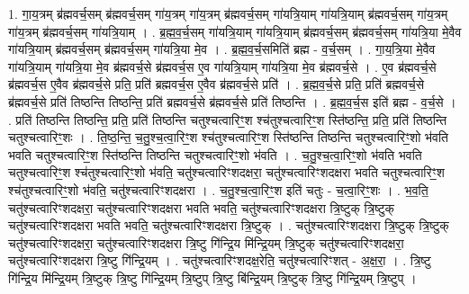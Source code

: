 \documentclass[17pt]{extarticle}
\begin{document}
1. गा॒य॒त्रम् ब्र॑ह्मवर्च॒सम् ब्र॑ह्मवर्च॒सम् गा॑य॒त्रम् गा॑य॒त्रम् ब्र॑ह्मवर्च॒सम् गा॑यत्रि॒याम् गा॑यत्रि॒याम् ब्र॑ह्मवर्च॒सम् गा॑य॒त्रम् गा॑य॒त्रम् ब्र॑ह्मवर्च॒सम् गा॑यत्रि॒याम् । . ब्र॒ह्म॒व॒र्च॒सम् गा॑यत्रि॒याम् गा॑यत्रि॒याम् ब्र॑ह्मवर्च॒सम् ब्र॑ह्मवर्च॒सम् गा॑यत्रि॒या मे॒वैव गा॑यत्रि॒याम् ब्र॑ह्मवर्च॒सम् ब्र॑ह्मवर्च॒सम् गा॑यत्रि॒या मे॒व । . ब्र॒ह्म॒व॒र्च॒समिति॑ ब्रह्म - व॒र्च॒सम् । . गा॒य॒त्रि॒या मे॒वैव गा॑यत्रि॒याम् गा॑यत्रि॒या मे॒व ब्र॑ह्मवर्च॒से ब्र॑ह्मवर्च॒स ए॒व गा॑यत्रि॒याम् गा॑यत्रि॒या मे॒व ब्र॑ह्मवर्च॒से । . ए॒व ब्र॑ह्मवर्च॒से ब्र॑ह्मवर्च॒स ए॒वैव ब्र॑ह्मवर्च॒से प्रति॒ प्रति॑ ब्रह्मवर्च॒स ए॒वैव ब्र॑ह्मवर्च॒से प्रति॑ । . ब्र॒ह्म॒व॒र्च॒से प्रति॒ प्रति॑ ब्रह्मवर्च॒से ब्र॑ह्मवर्च॒से प्रति॑ तिष्ठन्ति तिष्ठन्ति॒ प्रति॑ ब्रह्मवर्च॒से ब्र॑ह्मवर्च॒से प्रति॑ तिष्ठन्ति । . ब्र॒ह्म॒व॒र्च॒स इति॑ ब्रह्म - व॒र्च॒से । . प्रति॑ तिष्ठन्ति तिष्ठन्ति॒ प्रति॒ प्रति॑ तिष्ठन्ति चतुश्चत्वारिꣳ॒॒श श्च॑तुश्चत्वारिꣳ॒॒श स्ति॑ष्ठन्ति॒ प्रति॒ प्रति॑ तिष्ठन्ति चतुश्चत्वारिꣳ॒॒शः । . ति॒ष्ठ॒न्ति॒ च॒तु॒श्च॒त्वा॒रिꣳ॒॒श श्च॑तुश्चत्वारिꣳ॒॒श स्ति॑ष्ठन्ति तिष्ठन्ति चतुश्चत्वारिꣳ॒॒शो भ॑वति भवति चतुश्चत्वारिꣳ॒॒श स्ति॑ष्ठन्ति तिष्ठन्ति चतुश्चत्वारिꣳ॒॒शो भ॑वति । . च॒तु॒श्च॒त्वा॒रिꣳ॒॒शो भ॑वति भवति चतुश्चत्वारिꣳ॒॒श श्च॑तुश्चत्वारिꣳ॒॒शो भ॑वति॒ चतु॑श्चत्वारिꣳशदक्षरा॒ चतु॑श्चत्वारिꣳशदक्षरा भवति चतुश्चत्वारिꣳ॒॒श श्च॑तुश्चत्वारिꣳ॒॒शो भ॑वति॒ चतु॑श्चत्वारिꣳशदक्षरा । . च॒तु॒श्च॒त्वा॒रिꣳ॒॒श इति॑ चतुः - च॒त्वा॒रिꣳ॒॒शः । . भ॒व॒ति॒ चतु॑श्चत्वारिꣳशदक्षरा॒ चतु॑श्चत्वारिꣳशदक्षरा भवति भवति॒ चतु॑श्चत्वारिꣳशदक्षरा त्रि॒ष्टुक् त्रि॒ष्टुक् चतु॑श्चत्वारिꣳशदक्षरा भवति भवति॒ चतु॑श्चत्वारिꣳशदक्षरा त्रि॒ष्टुक् । . चतु॑श्चत्वारिꣳशदक्षरा त्रि॒ष्टुक् त्रि॒ष्टुक् चतु॑श्चत्वारिꣳशदक्षरा॒ चतु॑श्चत्वारिꣳशदक्षरा त्रि॒ष्टु गि॑न्द्रि॒य मि॑न्द्रि॒यम् त्रि॒ष्टुक् चतु॑श्चत्वारिꣳशदक्षरा॒ चतु॑श्चत्वारिꣳशदक्षरा त्रि॒ष्टु गि॑न्द्रि॒यम् । . चतु॑श्चत्वारिꣳशदक्ष॒रेति॒ चतु॑श्चत्वारिꣳशत् - अ॒क्ष॒रा॒ । . त्रि॒ष्टु गि॑न्द्रि॒य मि॑न्द्रि॒यम् त्रि॒ष्टुक् त्रि॒ष्टु गि॑न्द्रि॒यम् त्रि॒ष्टुप् त्रि॒ष्टु बि॑न्द्रि॒यम् त्रि॒ष्टुक् त्रि॒ष्टु गि॑न्द्रि॒यम् त्रि॒ष्टुप् । \newline
\end{document}
